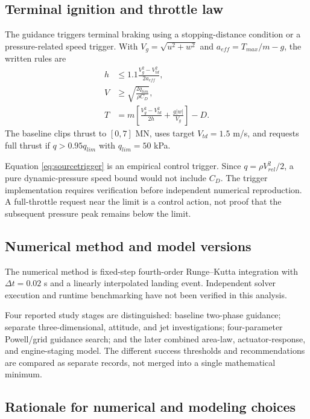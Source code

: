 \documentclass[11pt,a4paper]{article}
\begin{document}
\subsection{Terminal ignition and throttle law}
The guidance triggers terminal braking using a stopping-distance condition or a pressure-related speed trigger. With $V_g=\sqrt{u^2+w^2}$ and $a_{eff}=T_{max}/m-g$, the written rules are
\begin{align}
 h&\le1.1\frac{V_g^2-V_{td}^2}{2a_{eff}},\label{eq:stoprule}\\
 V&\ge\sqrt{\frac{2q_{lim}}{\rho C_D}},\label{eq:sourcetrigger}\\
 T&=m\left[\frac{V_g^2-V_{td}^2}{2h}+\frac{g|w|}{V_g}\right]-D.
\label{eq:thrustlaw}
\end{align}
The baseline clips thrust to $[0,7]$ MN, uses target $V_{td}=1.5$ m/s, and requests full thrust if $q>0.95q_{lim}$ with $q_{lim}=50$ kPa.

Equation \eqref{eq:sourcetrigger} is an empirical control trigger. Since $q=\rho V_{rel}^2/2$, a pure dynamic-pressure speed bound would not include $C_D$. The trigger implementation requires verification before independent numerical reproduction. A full-throttle request near the limit is a control action, not proof that the subsequent pressure peak remains below the limit.

\subsection{Numerical method and model versions}
The numerical method is fixed-step fourth-order Runge--Kutta integration with $\Delta t=0.02$ s and a linearly interpolated landing event. Independent solver execution and runtime benchmarking have not been verified in this analysis.

Four reported study stages are distinguished: baseline two-phase guidance; separate three-dimensional, attitude, and jet investigations; four-parameter Powell/grid guidance search; and the later combined area-law, actuator-response, and engine-staging model. The different success thresholds and recommendations are compared as separate records, not merged into a single mathematical minimum.


\subsection{Rationale for numerical and modeling choices}
\label{sec:rationale}
\end{document}
